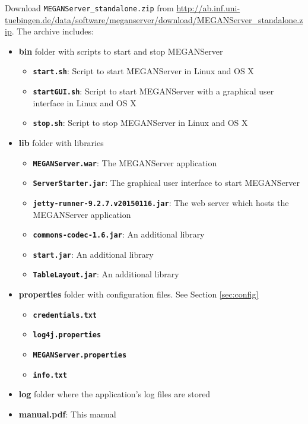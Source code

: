 \documentclass[11pt]{article}
\begin{document}
Download \texttt{MEGANServer\_standalone.zip} from \url{http://ab.inf.uni-tuebingen.de/data/software/meganserver/download/MEGANServer\_standalone.zip}. The archive includes:

\begin{itemize}

\item \textbf{bin} folder with scripts to start and stop MEGANServer
	\begin{itemize}
		\item \textbf{\texttt{start.sh}}: Script to start MEGANServer in Linux and OS X
		\item \textbf{\texttt{startGUI.sh}}: Script to start MEGANServer with a graphical user interface in Linux and OS X
		\item \textbf{\texttt{stop.sh}}: Script to stop MEGANServer in Linux and OS X
	\end{itemize}
\item \textbf{lib} folder with libraries
	\begin{itemize}
		\item \textbf{\texttt{MEGANServer.war}}: The MEGANServer application
		\item \textbf{\texttt{ServerStarter.jar}}: The graphical user interface to start MEGANServer
		\item \textbf{\texttt{jetty-runner-9.2.7.v20150116.jar}}: The web server which hosts the MEGANServer application
		\item \textbf{\texttt{commons-codec-1.6.jar}}: An additional library
		\item \textbf{\texttt{start.jar}}: An additional library
		\item \textbf{\texttt{TableLayout.jar}}: An additional library
	\end{itemize}
\item \textbf{properties} folder with configuration files. See Section \ref{sec:config}
	\begin{itemize}
	\item \textbf{\texttt{credentials.txt}}
	\item \textbf{\texttt{log4j.properties}}
	\item \textbf{\texttt{MEGANServer.properties}}
	\item \textbf{\texttt{info.txt}}
	\end{itemize}
\item \textbf{log} folder where the application's log files are stored
\item \textbf{manual.pdf}: This manual
\end{itemize}
\end{document}
